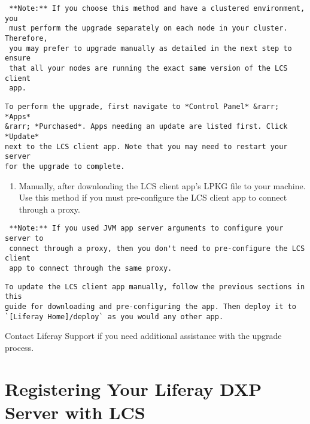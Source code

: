\noindent\hrulefill

\begin{verbatim}
 **Note:** If you choose this method and have a clustered environment, you
 must perform the upgrade separately on each node in your cluster. Therefore,
 you may prefer to upgrade manually as detailed in the next step to ensure
 that all your nodes are running the exact same version of the LCS client
 app.
\end{verbatim}

\noindent\hrulefill

\begin{verbatim}
To perform the upgrade, first navigate to *Control Panel* &rarr; *Apps*
&rarr; *Purchased*. Apps needing an update are listed first. Click *Update*
next to the LCS client app. Note that you may need to restart your server
for the upgrade to complete.
\end{verbatim}

\begin{enumerate}
\def\labelenumi{\arabic{enumi}.}
\setcounter{enumi}{1}
\tightlist
\item
  Manually, after downloading the LCS client app's LPKG file to your
  machine. Use this method if you must pre-configure the LCS client app
  to connect through a proxy.
\end{enumerate}

\noindent\hrulefill

\begin{verbatim}
 **Note:** If you used JVM app server arguments to configure your server to
 connect through a proxy, then you don't need to pre-configure the LCS client
 app to connect through the same proxy.
\end{verbatim}

\noindent\hrulefill

\begin{verbatim}
To update the LCS client app manually, follow the previous sections in this
guide for downloading and pre-configuring the app. Then deploy it to
`[Liferay Home]/deploy` as you would any other app.
\end{verbatim}

Contact Liferay Support if you need additional assistance with the
upgrade process.

\section{Registering Your Liferay DXP Server with
LCS}\label{registering-your-liferay-dxp-server-with-lcs}


